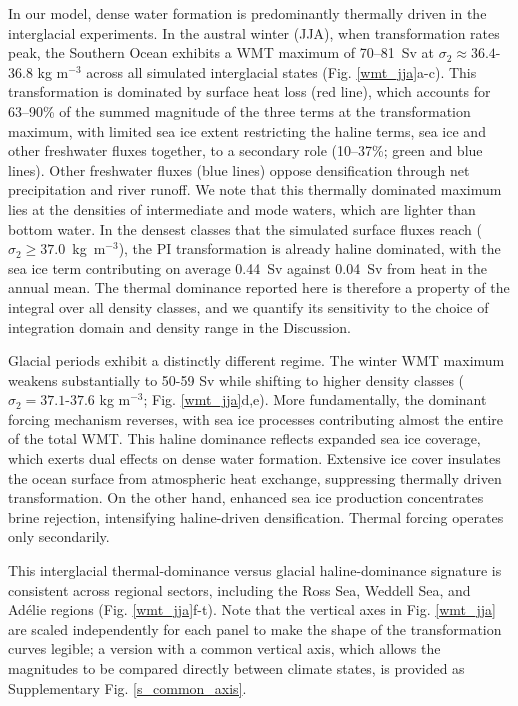 \documentclass[pdflatex,sn-nature]{sn-jnl}
\begin{document}
In our model, dense water formation is predominantly thermally driven in the interglacial experiments. In the austral winter (JJA), when transformation rates peak, the Southern Ocean exhibits a WMT maximum of 70--81~Sv at $\sigma_2 \approx 36.4$-$36.8$ kg m$^{-3}$ across all simulated interglacial states (Fig. \ref{wmt_jja}a-c). This transformation is dominated by surface heat loss (red line), which accounts for 63--90\% of the summed magnitude of the three terms at the transformation maximum, with limited sea ice extent restricting the haline terms, sea ice and other freshwater fluxes together, to a secondary role (10--37\%; green and blue lines). Other freshwater fluxes (blue lines) oppose densification through net precipitation and river runoff. We note that this thermally dominated maximum lies at the densities of intermediate and mode waters, which are lighter than bottom water. In the densest classes that the simulated surface fluxes reach ($\sigma_2 \ge 37.0$~kg~m$^{-3}$), the PI transformation is already haline dominated, with the sea ice term contributing on average 0.44~Sv against 0.04~Sv from heat in the annual mean. The thermal dominance reported here is therefore a property of the integral over all density classes, and we quantify its sensitivity to the choice of integration domain and density range in the Discussion.

Glacial periods exhibit a distinctly different regime. The winter WMT maximum weakens substantially to 50-59 Sv while shifting to higher density classes ($\sigma_2 = 37.1$-$37.6$ kg m$^{-3}$; Fig. \ref{wmt_jja}d,e). More fundamentally, the dominant forcing mechanism reverses, with sea ice processes contributing almost the entire of  the total WMT. This haline dominance reflects expanded sea ice coverage, which exerts dual effects on dense water formation.  Extensive ice cover insulates the ocean surface from atmospheric heat exchange, suppressing thermally driven transformation. On the other hand, enhanced sea ice production concentrates brine rejection, intensifying haline-driven densification. Thermal forcing operates only secondarily.

This interglacial thermal-dominance versus glacial haline-dominance signature is consistent across regional sectors, including the Ross Sea, Weddell Sea, and Ad\'{e}lie regions (Fig. \ref{wmt_jja}f-t). Note that the vertical axes in Fig. \ref{wmt_jja} are scaled independently for each panel to make the shape of the transformation curves legible; a version with a common vertical axis, which allows the magnitudes to be compared directly between climate states, is provided as Supplementary Fig. \ref{s_common_axis}.
\end{document}

